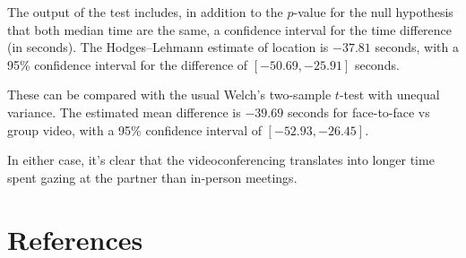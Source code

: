 \documentclass[
  11pt,
  letterpaper,
]{scrbook}
\theoremstyle{definition}
\theoremstyle{remark}
\begin{document}
The output of the test includes, in addition to the \(p\)-value for the
null hypothesis that both median time are the same, a confidence
interval for the time difference (in seconds). The Hodges--Lehmann
estimate of location is \(-37.81\) seconds, with a 95\% confidence
interval for the difference of \([-50.69, -25.91]\) seconds.

These can be compared with the usual Welch's two-sample \(t\)-test with
unequal variance. The estimated mean difference is \(-39.69\) seconds
for face-to-face vs group video, with a 95\% confidence interval of
\([-52.93, -26.45]\).

In either case, it's clear that the videoconferencing translates into
longer time spent gazing at the partner than in-person meetings.


\hypertarget{references}{%
\chapter{References}\label{references}}
\end{document}
